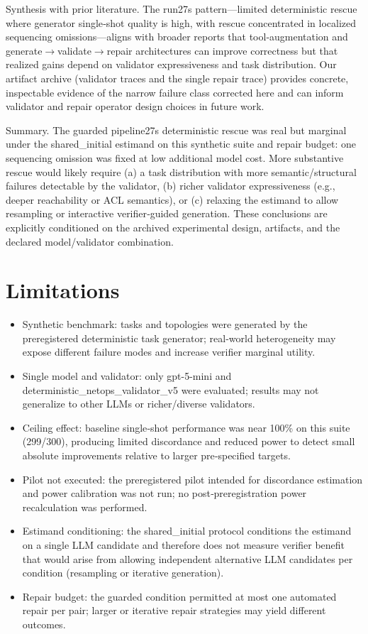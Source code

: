 \documentclass[conference]{IEEEtran}
\begin{document}
Synthesis with prior literature. The run 27s pattern---limited deterministic rescue where generator single‑shot quality is high, with rescue concentrated in localized sequencing omissions---aligns with broader reports that tool‑augmentation and generate\ensuremath{\rightarrow}validate\ensuremath{\rightarrow}repair architectures can improve correctness but that realized gains depend on validator expressiveness and task distribution. Our artifact archive (validator traces and the single repair trace) provides concrete, inspectable evidence of the narrow failure class corrected here and can inform validator and repair operator design choices in future work.

Summary. The guarded pipeline 27s deterministic rescue was real but marginal under the shared\_initial estimand on this synthetic suite and repair budget: one sequencing omission was fixed at low additional model cost. More substantive rescue would likely require (a) a task distribution with more semantic/structural failures detectable by the validator, (b) richer validator expressiveness (e.g., deeper reachability or ACL semantics), or (c) relaxing the estimand to allow resampling or interactive verifier‑guided generation. These conclusions are explicitly conditioned on the archived experimental design, artifacts, and the declared model/validator combination.

\section{Limitations}
\begin{itemize}
\item Synthetic benchmark: tasks and topologies were generated by the preregistered deterministic task generator; real‑world heterogeneity may expose different failure modes and increase verifier marginal utility.
\item Single model and validator: only gpt-5-mini and deterministic\_netops\_validator\_v5 were evaluated; results may not generalize to other LLMs or richer/diverse validators.
\item Ceiling effect: baseline single‑shot performance was near 100\% on this suite (299/300), producing limited discordance and reduced power to detect small absolute improvements relative to larger pre‑specified targets.
\item Pilot not executed: the preregistered pilot intended for discordance estimation and power calibration was not run; no post‑preregistration power recalculation was performed.
\item Estimand conditioning: the shared\_initial protocol conditions the estimand on a single LLM candidate and therefore does not measure verifier benefit that would arise from allowing independent alternative LLM candidates per condition (resampling or iterative generation).
\item Repair budget: the guarded condition permitted at most one automated repair per pair; larger or iterative repair strategies may yield different outcomes.
\end{itemize}
\end{document}
